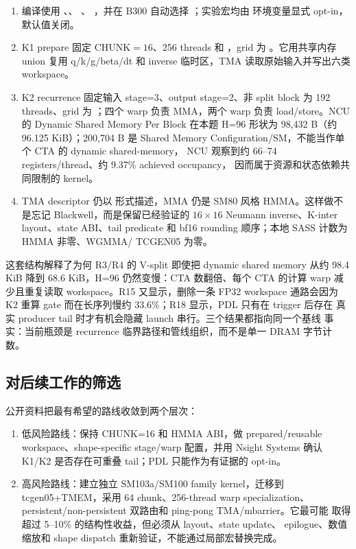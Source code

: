 \begin{enumerate}
  \item 编译使用 、、
        、
        ，并在 B300 自动选择 ；实验宏均由
        环境变量显式 opt-in，默认值关闭。
  \item K1 prepare 固定 \(\mathrm{CHUNK}=16\)、256 threads 和
        ，grid 为
        。它用共享内存 union 复用 q/k/g/beta/dt 和
        inverse 临时区，TMA 读取原始输入并写出六类 workspace。
  \item K2 recurrence 固定输入 stage=3、output stage=2、非 split block
        为 192 threads、grid 为 ；四个 warp 负责 MMA，两个 warp
        负责 load/store。NCU 的 Dynamic Shared Memory Per Block 在本题 H=96
        形状为 98,432 B（约 96.125 KiB）；200,704 B 是 Shared Memory
        Configuration/SM，不能当作单个 CTA 的 dynamic shared-memory，
        NCU 观察到约 66--74 registers/thread、约 9.37\% achieved occupancy，
        因而属于资源和状态依赖共同限制的 kernel。
  \item TMA descriptor 仍以  形式描述，MMA
        仍是 SM80 风格 HMMA。这样做不是忘记 Blackwell，而是保留已经验证的
        \(16\times16\) Neumann inverse、K-inter layout、state ABI、tail
        predicate 和 bf16 rounding 顺序；本地 SASS 计数为 HMMA 非零、WGMMA/
        TCGEN05 为零。
\end{enumerate}

这套结构解释了为何 R3/R4 的 V-split 即使把 dynamic shared memory 从约
98.4 KiB 降到 68.6 KiB，H=96 仍然变慢：CTA 数翻倍、每个 CTA 的计算 warp
减少且重复读取 workspace。R15 又显示，删除一条 FP32 workspace 通路会因为
K2 重算 gate 而在长序列慢约 33.6\%；R18 显示，PDL 只有在 trigger 后存在
真实 producer tail 时才有机会隐藏 launch 串行。三个结果都指向同一个基线
事实：当前瓶颈是 recurrence 临界路径和管线组织，而不是单一 DRAM 字节计数。

\subsection{对后续工作的筛选}

公开资料把最有希望的路线收敛到两个层次：

\begin{enumerate}
  \item 低风险路线：保持 CHUNK=16 和 HMMA ABI，做 prepared/reusable
        workspace、shape-specific stage/warp 配置，并用 Nsight Systems 确认
        K1/K2 是否存在可重叠 tail；PDL 只能作为有证据的 opt-in。
  \item 高风险路线：建立独立 SM103a/SM100 family kernel，迁移到
        tcgen05+TMEM，采用 64 chunk、256-thread warp specialization、
        persistent/non-persistent 双路由和 ping-pong TMA/mbarrier。它最可能
        取得超过 5--10\% 的结构性收益，但必须从 layout、state update、
        epilogue、数值缩放和 shape dispatch 重新验证，不能通过局部宏替换完成。
\end{enumerate}

